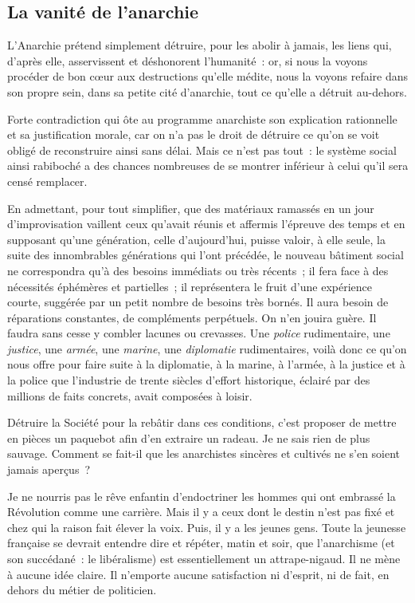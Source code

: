 \documentclass[french,twoside]{book} %
\newcommand{\astermono}{\medskip\centerline{\color{rubric}\large\selectfont{\syms ✻}}\medskip\par}%
\begin{document}
\astermono

\subsection[La vanité de l’anarchie]{La vanité de l’anarchie}
\noindent L’Anarchie prétend simplement détruire, pour les abolir à jamais, les liens qui, d’après elle, asservissent et déshonorent l’humanité : or, si nous la voyons procéder de bon cœur aux destructions qu’elle médite, nous la voyons refaire dans son propre sein, dans sa petite cité d’anarchie, tout ce qu’elle a détruit au-dehors.\par
Forte contradiction qui ôte au programme anarchiste son explication rationnelle et sa justification morale, car on n’a pas le droit de détruire ce qu’on se voit obligé de reconstruire ainsi sans délai. Mais ce n’est pas tout : le système social ainsi rabiboché a des chances nombreuses de se montrer inférieur à celui qu’il sera censé remplacer.\par
En admettant, pour tout simplifier, que des matériaux ramassés en un jour d’improvisation vaillent ceux qu’avait réunis et affermis l’épreuve des temps et en supposant qu’une génération, celle d’aujourd’hui, puisse valoir, à elle seule, la suite des innombrables générations qui l’ont précédée, le nouveau bâtiment social ne correspondra qu’à des besoins immédiats ou très récents ; il fera face à des nécessités éphémères et partielles ; il représentera le fruit d’une expérience courte, suggérée par un petit nombre de besoins très bornés. Il aura besoin de réparations constantes, de compléments perpétuels. On n’en jouira guère. Il faudra sans cesse y combler lacunes ou crevasses. Une \emph{police} rudimentaire, une \emph{justice}, une \emph{armée}, une \emph{marine}, une \emph{diplomatie} rudimentaires, voilà donc ce qu’on nous offre pour faire suite à la diplomatie, à la marine, à l’armée, à la justice et à la police que l’industrie de trente siècles d’effort historique, éclairé par des millions de faits concrets, avait composées à loisir.\par

\astermono

\noindent Détruire la Société pour la rebâtir dans ces conditions, c’est proposer de mettre en pièces un paquebot afin d’en extraire un radeau. Je ne sais rien de plus sauvage. Comment se fait-il que les anarchistes sincères et cultivés ne s’en soient jamais aperçus ?\par
Je ne nourris pas le rêve enfantin d’endoctriner les hommes qui ont embrassé la Révolution comme une carrière. Mais il y a ceux dont le destin n’est pas fixé et chez qui la raison fait élever la voix. Puis, il y a les jeunes gens. Toute la jeunesse française se devrait entendre dire et répéter, matin et soir, que l’anarchisme (et son succédané : le libéralisme) est essentiellement un attrape-nigaud. Il ne mène à aucune idée claire. Il n’emporte aucune satisfaction ni d’esprit, ni de fait, en dehors du métier de politicien.\par
\end{document}
